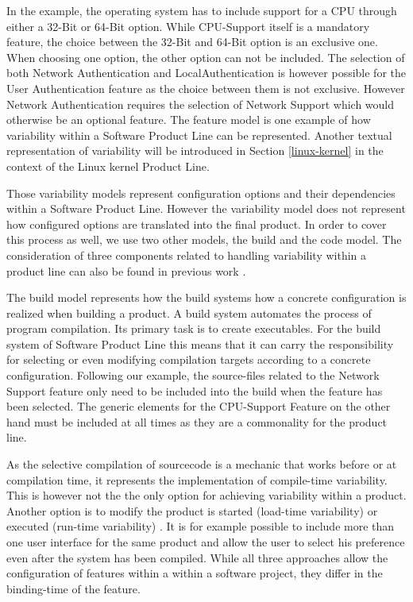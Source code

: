 \documentclass[a4paper]{article}
\begin{document}
In the example, the operating system has to include support for a CPU through either a 32-Bit or 64-Bit option. While CPU-Support itself is a mandatory feature, the choice between the 32-Bit and 64-Bit option is an exclusive one. When choosing one option, the other option can not be included. The selection of both Network Authentication and LocalAuthentication is however possible for the User Authentication feature as the choice between them is not exclusive. However Network Authentication requires the selection of Network Support which would otherwise be an optional feature. The feature model is one example of how variability within a Software Product Line can be represented. Another textual representation of variability will be introduced in Section \ref{linux-kernel} in the context of the Linux kernel Product Line. 

Those variability models represent configuration options and their dependencies within a Software Product Line. However the variability model does not represent how configured options are translated into the final product. In order to cover this process as well, we use two other models, the build and the code model. The consideration of three components related to handling variability within a product line can also be found in previous work \cite{nadi-linux-kernel} \cite{mining-kbuild} \cite{KroeherEl-SharkawySchmid18}.

The build model represents how the build systems how a concrete configuration is realized when building a product. A build system automates the process of program compilation. Its primary task is to create executables. For the build system of Software Product Line this means that it can carry the responsibility for selecting or even modifying compilation targets according to a concrete configuration. Following our example, the source-files related to the Network Support feature only need to be included into the build when the feature has been selected. The generic elements for the CPU-Support Feature on the other hand must be included at all times as they are a commonality for the product line. 

As the selective compilation of sourcecode is a mechanic that works before or at compilation time, it represents the implementation of compile-time variability. This is however not the the only option for achieving variability within a product. Another option is to modify the product is started (load-time variability) or executed (run-time variability) \cite[p.49]{Apel:2013:FSP:2541773}. It is for example possible to include more than one user interface for the same product and allow the user to select his preference even after the system has been compiled. While all three approaches allow the configuration of features within a within a software project, they differ in the binding-time of the feature. 
\end{document}
